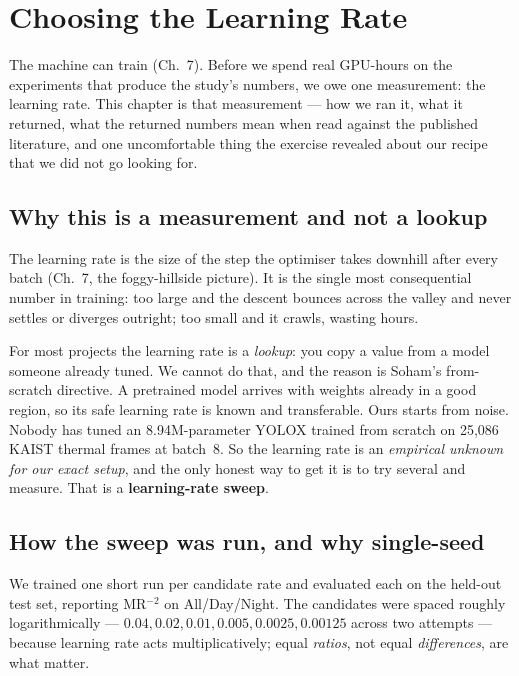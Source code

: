 \documentclass[../main.tex]{subfiles}
\begin{document}
\noindent{}\par\medskip

\chapter{Choosing the Learning Rate}

The machine can train (Ch.~7). Before we spend real GPU-hours on the experiments that produce the
study's numbers, we owe one measurement: the learning rate. This chapter is that measurement --- how
we ran it, what it returned, what the returned numbers mean when read against the published
literature, and one uncomfortable thing the exercise revealed about our recipe that we did not go
looking for.

\section{Why this is a measurement and not a lookup}

The learning rate is the size of the step the optimiser takes downhill after every batch (Ch.~7,
the foggy-hillside picture). It is the single most consequential number in training: too large and
the descent bounces across the valley and never settles or diverges outright; too small and it
crawls, wasting hours.

For most projects the learning rate is a \emph{lookup}: you copy a value from a model someone
already tuned. We cannot do that, and the reason is Soham's from-scratch directive. A pretrained
model arrives with weights already in a good region, so its safe learning rate is known and
transferable. Ours starts from noise. Nobody has tuned an 8.94M-parameter YOLOX trained from
scratch on 25{,}086 KAIST thermal frames at batch~8. So the learning rate is an \emph{empirical
unknown for our exact setup}, and the only honest way to get it is to try several and measure.
That is a \textbf{learning-rate sweep}.

\section{How the sweep was run, and why single-seed}

We trained one short run per candidate rate and evaluated each on the held-out test set, reporting
MR$^{-2}$ on All/Day/Night. The candidates were spaced roughly logarithmically --- $0.04, 0.02,
0.01, 0.005, 0.0025, 0.00125$ across two attempts --- because learning rate acts multiplicatively;
equal \emph{ratios}, not equal \emph{differences}, are what matter.
\end{document}
